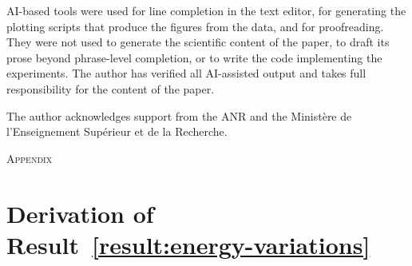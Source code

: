 \documentclass[11pt,english,reqno]{article}
\theoremstyle{plain}
\theoremstyle{definition}
\theoremstyle{remark}
\numberwithin{equation}{section}
\begin{document}
AI-based tools were used for line completion in the text editor, for generating the plotting scripts that produce the figures from the data, and for proofreading. They were not used to generate the scientific content of the paper, to draft its prose beyond phrase-level completion, or to write the code implementing the experiments. The author has verified all AI-assisted output and takes full responsibility for the content of the paper.

The author acknowledges support from the ANR and the Ministère de l’Enseignement Supérieur et de la Recherche.






\newpage
\appendix

\vspace*{1cm}

\begin{center}
	\textsc{\Huge Appendix}	
\end{center}




\section{Derivation of Result~\ref{result:energy-variations}}
\label{sec:proof-energy-variations}
\end{document}
